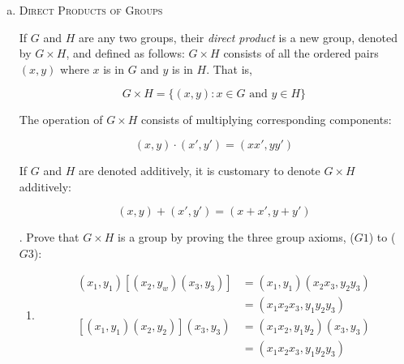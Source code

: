 \documentclass[twoside]{amsart}
\begin{document}
\begin{enumerate}[A.]
\begin{enumerate}[(a)]
\begin{proof}
      The first case is handled by part 4. Every element is
      equal to their own inverse. That leaves only 6 pairs to
      figure out $ab,ac,ba,bc,ca,cb$. In each case we are constrained
      by what we learned in F1. $ab$ must equal $c$, $ac$ must equal $b$
      etc.

      The second case is handled by part 5. We choose 2 elements (besides
      $e$ to not be equal to their inverse and 1 to be equal to its
      inverse).  We chose $a$ to be the one equal to its inverse. That
      requires $ab=c$ and $ac=b$. We know $ba$ must be $c$ or $e$,
      $bb$ can be $a$ or $c$ and $bc$ must be $a$ or $e$. We can
      choose these in any way as long as we maitain the constraints.
      However, the results are always the ``same'' in that they only
      amount to relabeling our elements with different symbols.

      FURTHER AND BETTER ANALYSIS FOR PROOF REQUIRED
      \end{proof}

      \item \textsc{Direct Products of Groups}

      \noindent If $G$ and $H$ are any two groups, their
      \emph{direct product} is a new group, denoted by $G \times H$,
      and defined as follows: $G \times H$ consists of all the ordered
      pairs $(x,y)$ where $x$ is in $G$ and $y$ is in $H$. That is,

      \[ 
         G \times H = \{(x,y) : x \in G \text{ and } y \in H \} 
      \] 

      The operation of $G \times H$ consists of multiplying corresponding
      components:

      \[ 
         (x,y)\cdot(x',y') = (xx',yy') 
      \]

      If $G$ and $H$ are denoted additively, it is customary to denote
      $G \times H$ additively:

      $$ (x,y)+(x',y') = (x+x',y+y') $$

      . Prove that $G \times H$ is a group by proving
      the three group axioms, ($G1$) to ($G3$):
      \begin{enumerate}[(G1)]
         \item \begin{align*}
	    (x_1,y_1)[(x_2,y_w)(x_3,y_3)] & = (x_1,y_1)(x_2x_3,y_2y_3) \\
	                                  & = (x_1x_2x_3,y_1y_2y_3) \\
	    [(x_1,y_1)(x_2,y_2)](x_3,y_3) & = (x_1x_2,y_1y_2)(x_3,y_3) \\
	                                  & = (x_1x_2x_3,y_1y_2y_3)
	 \end{align*}


\end{enumerate}
\end{enumerate}
\end{enumerate}
\end{document}
